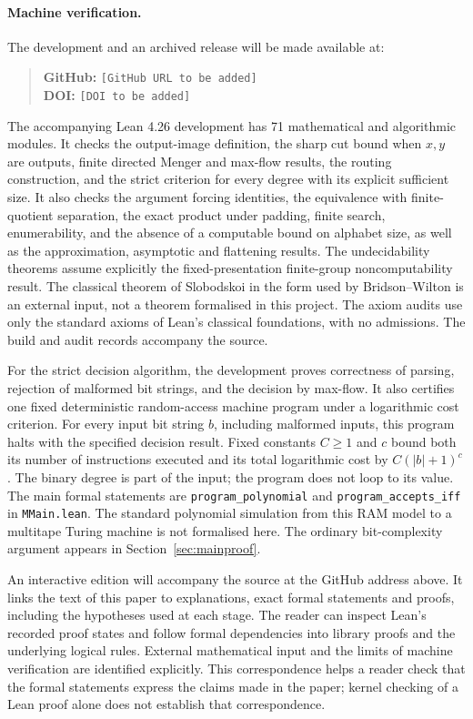 \documentclass[12pt]{article}
\theoremstyle{definition}
\newcommand{\PaperThreeLeanGitHub}{\texttt{[GitHub URL to be added]}}
\newcommand{\PaperThreeLeanDOI}{\texttt{[DOI to be added]}}
\begin{document}
\paragraph{Machine verification.}
The development and an archived release will be made available at:
\begin{quote}
\noindent\textbf{GitHub:} \PaperThreeLeanGitHub\\
\textbf{DOI:} \PaperThreeLeanDOI
\end{quote}
The accompanying Lean 4.26 development has 71 mathematical and
algorithmic modules. It checks the output-image definition, the sharp
cut bound when $x,y$ are outputs, finite directed Menger and max-flow
results, the routing construction, and the strict criterion for every
degree with its explicit sufficient size. It also checks the argument
forcing identities, the equivalence with finite-quotient separation,
the exact product under padding, finite search, enumerability, and the
absence of a computable bound on alphabet size, as well as the
approximation, asymptotic and flattening results.
The undecidability theorems assume explicitly the fixed-presentation
finite-group noncomputability result. The classical theorem of
Slobodskoi in the form used by Bridson--Wilton is an external input,
not a theorem formalised in this project. The axiom audits use only
the standard axioms of Lean's classical foundations, with no admissions.
The build and audit records accompany the source.

For the strict decision algorithm, the development proves correctness
of parsing, rejection of malformed bit strings, and the decision by
max-flow. It also certifies one fixed deterministic random-access
machine program under a logarithmic cost criterion. For every input
bit string $b$, including malformed inputs, this program halts with
the specified decision result. Fixed constants $C\ge1$ and $c$ bound
both its number of instructions executed and its total logarithmic
cost by $C(|b|+1)^c$. The binary degree is part of the input; the
program does not loop to its value. The main formal statements are
\texttt{program\_polynomial} and \texttt{program\_accepts\_iff}
in \texttt{MMain.lean}. The standard polynomial simulation from
this RAM model to a multitape Turing machine is not formalised here.
The ordinary bit-complexity argument appears in
Section~\ref{sec:mainproof}.

An interactive edition will accompany the source at the GitHub address
above. It links the text of this paper to explanations, exact formal
statements and proofs, including the hypotheses used at each stage.
The reader can inspect Lean's recorded proof states and follow formal
dependencies into library proofs and the underlying logical rules.
External mathematical input and the limits of machine verification
are identified explicitly. This correspondence helps a reader check
that the formal statements express the claims made in the paper;
kernel checking of a Lean proof alone does not establish that
correspondence.



\end{document}
